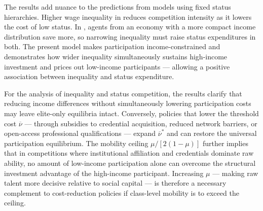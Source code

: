 \documentclass[
    oneside,
    fontsize=10pt,leqno]{article}
\begin{document}
The results add nuance to the predictions from models using fixed
status hierarchies. Higher wage inequality in \citet{FrankAER1984}
reduces competition intensity as it lowers the cost of low status.
In \citet{ColeMailaithPostlewaite1992}, agents from an economy with
a more compact income distribution save more, so narrowing inequality
must raise status expenditures in both. The present model makes
participation income-constrained and demonstrates how wider
inequality simultaneously sustains high-income investment and prices
out low-income participants --- allowing a positive association
between inequality and status expenditure.


For the analysis of inequality and status competition, the results
clarify that reducing income differences without simultaneously
lowering participation costs may leave elite-only equilibria intact.
Conversely, policies that lower the threshold cost $\overline{\nu}$
--- through subsidies to credential acquisition, reduced network
barriers, or open-access professional qualifications --- expand
$\overline{\nu}^{*}$ and can restore the universal participation
equilibrium. The mobility ceiling $\mu/[2(1-\mu)]$ further implies
that in competitions where institutional affiliation and credentials
dominate raw ability, no amount of low-income participation alone can
overcome the structural investment advantage of the high-income participant. Increasing
$\mu$ --- making raw talent more decisive relative to social capital
--- is therefore a necessary complement to cost-reduction policies
if class-level mobility is to exceed the ceiling.
\end{document}
